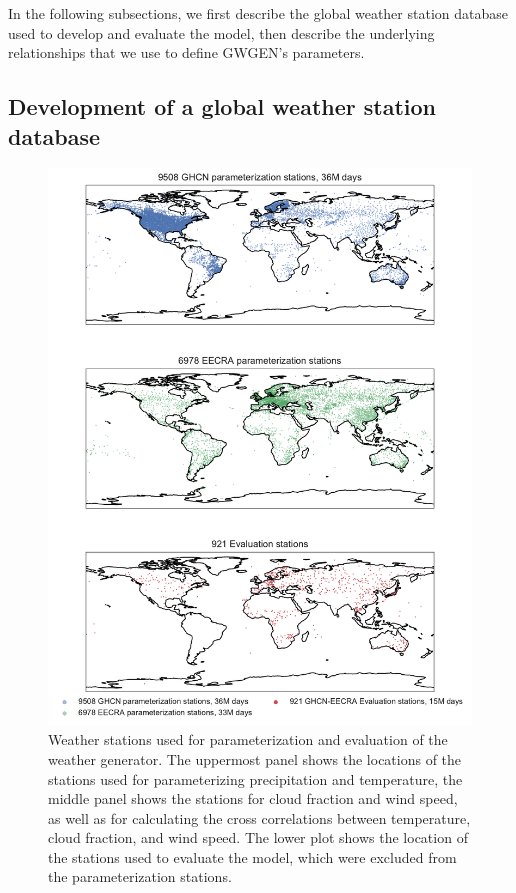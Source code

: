 \documentclass[
11pt, %
english, %
singlespacing, %
headsepline, %
]{MastersDoctoralThesis} %
\begin{document}
\begin{NoHyper}
\begin{refsection}
In the following subsections, we first describe the global weather station database used to develop and evaluate the model, then describe  the underlying relationships that we use to define GWGEN's parameters.

\subsection{Development of a global weather station database}

\begin{figure}
	\includegraphics[width=\linewidth]{gwgen-figures/f02.pdf}
	\caption[Weather stations used for parameterization and evaluation of the weather generator.]{Weather stations used for parameterization and evaluation of the weather generator. The uppermost panel shows the locations of the stations used for parameterizing precipitation and temperature, the middle panel shows the stations for cloud fraction and wind speed, as well as for calculating the cross correlations between temperature, cloud fraction, and wind speed. The lower plot shows the location of the stations used to evaluate the model, which were excluded from the parameterization stations.}
	\label{fig:stations}
\end{figure}


\end{refsection}
\end{NoHyper}
\end{document}
